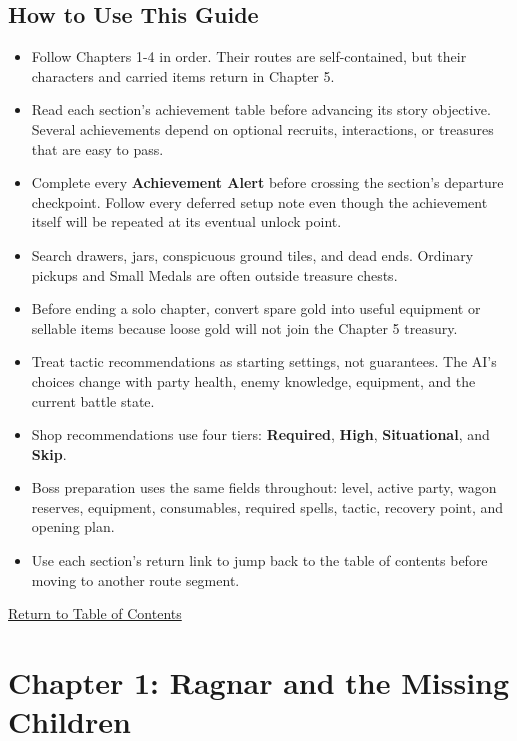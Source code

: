 \documentclass[
  american,
  10pt,
  letterpaper,
  oneside,
  open=any]{scrreprt}
\providecommand{\tightlist}{%
  \setlength{\itemsep}{0pt}\setlength{\parskip}{0pt}}
\begin{document}
\section{How to Use This Guide}\label{how-to-use-this-guide}

\begin{itemize}
\tightlist
\item
  Follow Chapters 1-4 in order. Their routes are self-contained, but
  their characters and carried items return in Chapter 5.
\item
  Read each section's achievement table before advancing its story
  objective. Several achievements depend on optional recruits,
  interactions, or treasures that are easy to pass.
\item
  Complete every \textbf{Achievement Alert} before crossing the
  section's departure checkpoint. Follow every deferred setup note even
  though the achievement itself will be repeated at its eventual unlock
  point.
\item
  Search drawers, jars, conspicuous ground tiles, and dead ends.
  Ordinary pickups and Small Medals are often outside treasure chests.
\item
  Before ending a solo chapter, convert spare gold into useful equipment
  or sellable items because loose gold will not join the Chapter 5
  treasury.
\item
  Treat tactic recommendations as starting settings, not guarantees. The
  AI's choices change with party health, enemy knowledge, equipment, and
  the current battle state.
\item
  Shop recommendations use four tiers: \textbf{Required}, \textbf{High},
  \textbf{Situational}, and \textbf{Skip}.
\item
  Boss preparation uses the same fields throughout: level, active party,
  wagon reserves, equipment, consumables, required spells, tactic,
  recovery point, and opening plan.
\item
  Use each section's return link to jump back to the table of contents
  before moving to another route segment.
\end{itemize}

\hyperref[table-of-contents]{Return to Table of Contents}

\chapter{Chapter 1: Ragnar and the Missing
Children}\label{chapter-1-ragnar-and-the-missing-children}
\end{document}
